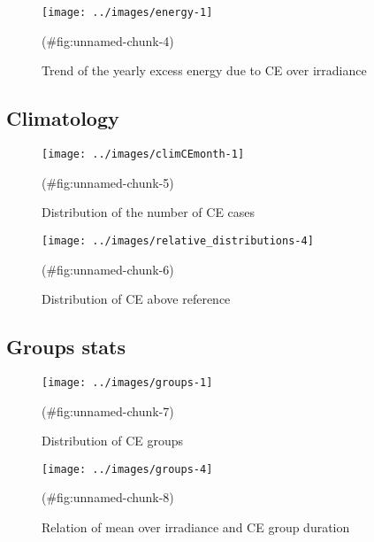 \documentclass[
]{article}
\begin{document}
\begin{figure}[h!]

{\centering \texttt{[image: ../images/energy-1]} 

}

\caption{Trend of the yearly excess energy due to CE over irradiance}(\#fig:unnamed-chunk-4)
\end{figure}

\FloatBarrier

\hypertarget{climatology}{%
\subsection{Climatology}\label{climatology}}

\begin{figure}[h!]

{\centering \texttt{[image: ../images/climCEmonth-1]} 

}

\caption{Distribution of the number of CE cases}(\#fig:unnamed-chunk-5)
\end{figure}

\begin{figure}[h!]

{\centering \texttt{[image: ../images/relative\_distributions-4]} 

}

\caption{Distribution of CE above reference}(\#fig:unnamed-chunk-6)
\end{figure}

\FloatBarrier

\hypertarget{groups-stats}{%
\subsection{Groups stats}\label{groups-stats}}

\begin{figure}[h!]

{\centering \texttt{[image: ../images/groups-1]} 

}

\caption{Distribution of CE groups}(\#fig:unnamed-chunk-7)
\end{figure}

\begin{figure}[h!]

{\centering \texttt{[image: ../images/groups-4]} 

}

\caption{Relation of mean over irradiance and CE group duration}(\#fig:unnamed-chunk-8)
\end{figure}
\end{document}
